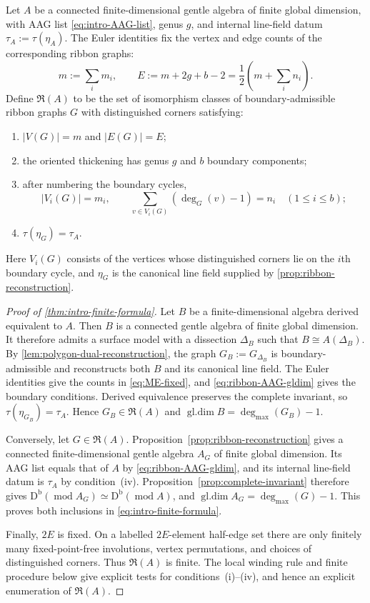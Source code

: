 \documentclass[11pt]{amsart}
\theoremstyle{definition}
\theoremstyle{plain}
\theoremstyle{definition}
\theoremstyle{definition}
\newcommand{\Db}{\mathrm D^{\mathrm b}}
\newcommand{\modu}{\operatorname{mod}}
\newcommand{\gldim}{\operatorname{gl.dim}}
\newcommand{\degmax}{\deg_{\max}}
\begin{document}
Let $A$ be a connected finite-dimensional gentle algebra of finite
global dimension, with AAG list \eqref{eq:intro-AAG-list}, genus $g$,
and internal line-field datum $\tau_A:=\tau(\eta_A)$.
The Euler identities fix the vertex and edge counts of the
corresponding ribbon graphs:
\begin{equation}
\label{eq:ME-fixed}
 m:=\sum_i m_i,
 \qquad
 E:=m+2g+b-2=\frac12\left(m+\sum_i n_i\right).
\end{equation}
Define $\mathfrak R(A)$ to be the set of isomorphism classes of
boundary-admissible ribbon graphs $G$ with distinguished corners
satisfying:
\begin{enumerate}[label=\textup{(\roman*)}]
\item $|V(G)|=m$ and $|E(G)|=E$;
\item the oriented thickening has genus $g$ and $b$ boundary components;
\item after numbering the boundary cycles,
\begin{equation}
\label{eq:R-boundary-data}
 |V_i(G)|=m_i,
 \qquad
 \sum_{v\in V_i(G)}(\deg_G(v)-1)=n_i
 \quad(1\leq i\leq b);
\end{equation}
\item $\tau(\eta_G)=\tau_A$.
\end{enumerate}
Here $V_i(G)$ consists of the vertices whose distinguished corners
lie on the $i$th boundary cycle, and $\eta_G$ is the canonical line
field supplied by \cref{prop:ribbon-reconstruction}.

\begin{proof}[Proof of \cref{thm:intro-finite-formula}]
Let $B$ be a finite-dimensional algebra derived equivalent to $A$.
Then $B$ is a connected gentle algebra of finite global dimension. It therefore admits a surface model with a dissection $\Delta_B$ such that $B\cong A(\Delta_B)$.  By
\cref{lem:polygon-dual-reconstruction}, the graph
$G_B:=G_{\Delta_B}$ is boundary-admissible and reconstructs both
$B$ and its canonical line field.  The Euler identities give the
counts in \eqref{eq:ME-fixed}, and \eqref{eq:ribbon-AAG-gldim}
gives the boundary conditions.  Derived equivalence preserves the
complete invariant, so $\tau(\eta_{G_B})=\tau_A$.  Hence
$G_B\in\mathfrak R(A)$ and
$\gldim B=\degmax(G_B)-1$.

Conversely, let $G\in\mathfrak R(A)$.
Proposition~\ref{prop:ribbon-reconstruction} gives a connected
finite-dimensional gentle algebra $A_G$ of finite global dimension.
Its AAG list equals that of $A$ by \eqref{eq:ribbon-AAG-gldim},
and its internal line-field datum is $\tau_A$ by condition~(iv).
Proposition~\ref{prop:complete-invariant} therefore gives
$\Db(\modu A_G)\simeq\Db(\modu A)$, and
$\gldim A_G=\degmax(G)-1$.  This proves both inclusions in
\eqref{eq:intro-finite-formula}.

Finally, $2E$ is fixed.  On a labelled $2E$-element half-edge set
there are only finitely many fixed-point-free involutions, vertex
permutations, and choices of distinguished corners.  Thus
$\mathfrak R(A)$ is finite.  The local winding rule and finite
procedure below give explicit tests for conditions~(i)--(iv),
and hence an explicit enumeration of $\mathfrak R(A)$.
\end{proof}
\end{document}
